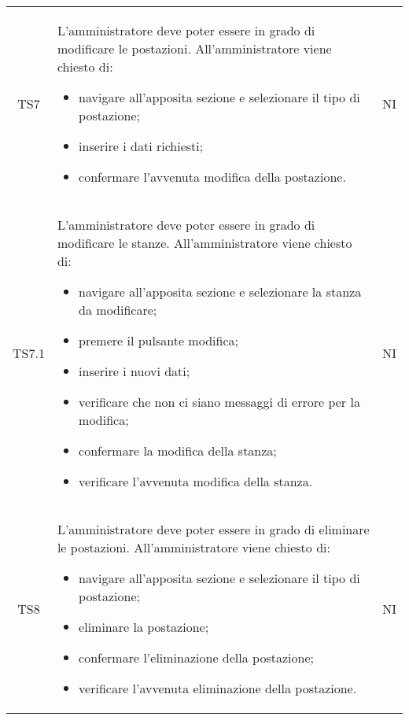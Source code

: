 {\begin{longtable}{ c C{11cm} c }
        TS7&
        \begin{flushleft}
            L'amministratore deve poter essere in grado di modificare le postazioni.
            All'amministratore viene chiesto di:
        \end{flushleft}
        \begin{itemize}
            \item navigare all'apposita sezione e selezionare il tipo di postazione;
            \item inserire i dati richiesti;
            \item confermare l'avvenuta modifica della postazione.
        \end{itemize}&
        NI\\

        TS7.1&
        \begin{flushleft}
            L'amministratore deve poter essere in grado di modificare le stanze.
            All'amministratore viene chiesto di:
        \end{flushleft}
        \begin{itemize}
            \item navigare all'apposita sezione e selezionare la stanza da modificare;
            \item premere il pulsante modifica;
            \item inserire i nuovi dati;
            \item verificare che non ci siano messaggi di errore per la modifica;
            \item confermare la modifica della stanza;
            \item verificare l'avvenuta modifica della stanza.
        \end{itemize}&
        NI\\

        TS8&
        \begin{flushleft}
            L'amministratore deve poter essere in grado di eliminare le postazioni.
            All'amministratore viene chiesto di:
        \end{flushleft}
        \begin{itemize}
            \item navigare all'apposita sezione e selezionare il tipo di postazione;
            \item eliminare la postazione;
            \item confermare l'eliminazione della postazione;
            \item verificare l'avvenuta eliminazione della postazione.
        \end{itemize}&
        NI\\


\end{longtable}}
